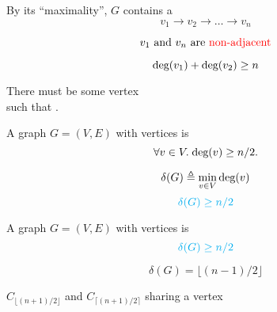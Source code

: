 \begin{frame}{}
  \begin{center}
    By its ``maximality'', $G$ contains a  \\[3pt]
    \[
      v_{1} \to v_{2} \to \dots \to v_{n}
    \]

    \pause
    \vspace{-0.60cm}
    \[
      v_{1} \text{ and } v_{n} \text{ are \textcolor{red}{non-adjacent}}
    \]

    \pause
    \vspace{-0.60cm}
    \[
      \text{deg}(v_{1}) + \text{deg}(v_{2}) \ge n
    \]

    \pause
    There must be some vertex  \\[3pt]
    such that .
  \end{center}
\end{frame}

\begin{frame}{}
  \begin{theorem}
    A  graph $G = (V, E)$
    with  vertices is 
    \[
      \forall v \in V.\; \text{deg}(v) \ge n/2.
    \]
  \end{theorem}

  \pause
  \[
    \delta(G) \triangleq \min_{v \in V} \text{deg}(v)
  \]
  \[
    \textcolor{cyan}{\delta(G) \ge n/2}
  \]

  \pause
\end{frame}

\begin{frame}{}
  \begin{theorem}
    A  graph $G = (V, E)$
    with  vertices is 
    \[
      \textcolor{cyan}{\delta(G) \ge n/2}
    \]
  \end{theorem}

  \pause
  \[
    \delta(G) = \lfloor (n-1)/2 \rfloor
  \]

  \pause
  \vspace{0.30cm}
  \begin{center}
    $C_{\lfloor (n + 1)/ 2 \rfloor}$ and $C_{\lceil (n+1)/2 \rceil}$
    sharing a vertex
  \end{center}
\end{frame}
